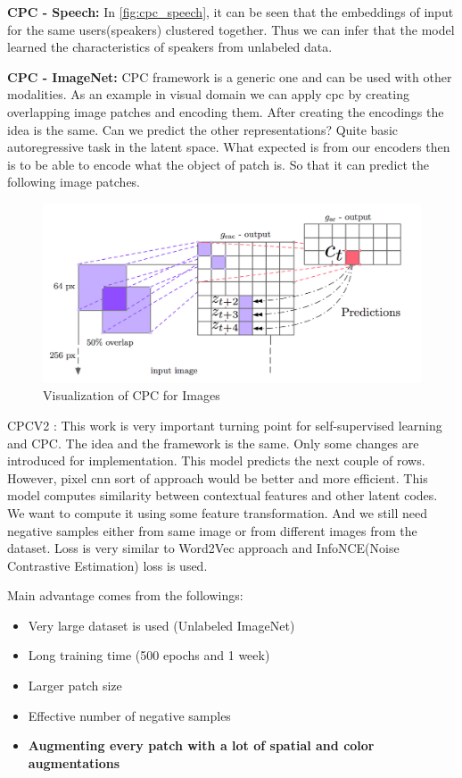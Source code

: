 \documentclass{article}
\begin{document}
\textbf{CPC - Speech: } In \ref{fig:cpc_speech}, it can be seen that
the embeddings of input for the same users(speakers) clustered together.
Thus we can infer that the model learned the characteristics of speakers
from unlabeled data.
 
\textbf{CPC - ImageNet: } CPC framework is a generic one and can be used with
other modalities. As an example in visual domain we can apply cpc by
creating overlapping image patches and encoding them. After creating the
encodings the idea is the same. Can we predict the other representations?
Quite basic autoregressive task in the latent space.
What expected is from our encoders then is to be able to encode what the
object of patch is. So that it can predict the following image patches.
 
\begin{figure}[H]
   \centering
   \includegraphics[width=0.8\linewidth]{figures/cpc-imagenet.png}
   \caption{Visualization of CPC for Images}
   \label{fig:cpc_imagenet}
\end{figure}
 
CPCV2 \cite{henaff2020data}: This work is very important turning
point for self-supervised learning and CPC. The idea and the framework
is the same. Only some changes are introduced for implementation.
This model predicts the next couple of rows. However, pixel cnn sort of approach would be
better and more efficient.
This model computes similarity between contextual features and
other latent codes. We want to compute it using some feature transformation.
And we still need negative samples either from same image or from different
images from the dataset.
Loss is very similar to Word2Vec approach and InfoNCE(Noise Contrastive Estimation)
loss is used.
 
 
Main advantage comes from the followings:
 
\begin{itemize}
   \item Very large dataset is used (Unlabeled ImageNet)
   \item Long training time (500 epochs and 1 week)
   \item Larger patch size
   \item Effective number of negative samples
   \item \textbf{Augmenting every patch with a lot
   of spatial and color augmentations}
\end{itemize}
 
\end{document}

